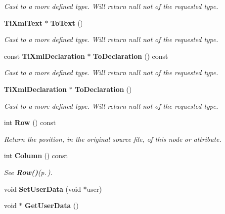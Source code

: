 \begin{CompactItemize}
\begin{CompactList}\small\item\em Cast to a more defined type. Will return null not of the requested type. \item\end{CompactList}\item 
{\bf Ti\-Xml\-Text} $\ast$ {\bf To\-Text} ()\label{classTiXmlNode_TiXmlUnknowna75}

\begin{CompactList}\small\item\em Cast to a more defined type. Will return null not of the requested type. \item\end{CompactList}\item 
const {\bf Ti\-Xml\-Declaration} $\ast$ {\bf To\-Declaration} () const\label{classTiXmlNode_TiXmlUnknowna76}

\begin{CompactList}\small\item\em Cast to a more defined type. Will return null not of the requested type. \item\end{CompactList}\item 
{\bf Ti\-Xml\-Declaration} $\ast$ {\bf To\-Declaration} ()\label{classTiXmlNode_TiXmlUnknowna77}

\begin{CompactList}\small\item\em Cast to a more defined type. Will return null not of the requested type. \item\end{CompactList}\item 
int {\bf Row} () const
\begin{CompactList}\small\item\em Return the position, in the original source file, of this node or attribute. \item\end{CompactList}\item 
int {\bf Column} () const\label{classTiXmlBase_TiXmlUnknowna79}

\begin{CompactList}\small\item\em See {\bf Row()}{\rm (p.\,\pageref{classTiXmlBase_TiXmlUnknowna78})}. \item\end{CompactList}\item 
void {\bf Set\-User\-Data} (void $\ast$user)\label{classTiXmlBase_TiXmlUnknowna80}

\item 
void $\ast$ {\bf Get\-User\-Data} ()\label{classTiXmlBase_TiXmlUnknowna81}

\end{CompactItemize}

